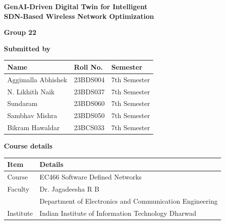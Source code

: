 \begin{titlepage}
\centering
\vspace*{2cm}
{\LARGE\bfseries GenAI-Driven Digital Twin for Intelligent\\[4pt] SDN-Based Wireless Network Optimization\par}
\vspace{1.2cm}

{\Large\bfseries Group 22\par}
\vspace{1.2cm}

{\large\bfseries Submitted by\par}
\vspace{8pt}
\begin{tabular}{|l|l|l|}
\hline
\rowcolor{tablehead}
\textbf{Name} & \textbf{Roll No.} & \textbf{Semester} \\ \hline
Aggimalla Abhishek & 23BDS004 & 7th Semester \\ \hline
N. Likhith Naik & 23BDS037 & 7th Semester \\ \hline
Sundaram & 23BDS060 & 7th Semester \\ \hline
Sambhav Mishra & 23BDS050 & 7th Semester \\ \hline
Bikram Hawaldar & 23BCS033 & 7th Semester \\ \hline
\end{tabular}

\vspace{1.5cm}
{\large\bfseries Course details\par}
\vspace{8pt}
\begin{tabular}{|l|l|}
\hline
\rowcolor{tablehead}
\textbf{Item} & \textbf{Details} \\ \hline
Course & EC466 Software Defined Networks \\ \hline
Faculty & Dr. Jagadeesha R B \\
 & Department of Electronics and Communication Engineering \\ \hline
Institute & Indian Institute of Information Technology Dharwad \\ \hline
\end{tabular}
\end{titlepage}
